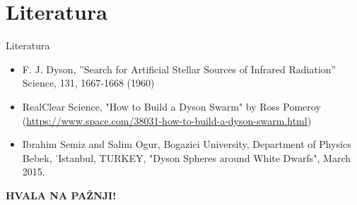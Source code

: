 \documentclass[13pt]{beamer}
\begin{document}
\section{Literatura}

\begin{frame}{Literatura}

\begin{itemize}
    \item F. J. Dyson, ”Search for Artificial Stellar Sources of Infrared Radiation”
Science, 131, 1667-1668 (1960)
    \item RealClear Science, "How to Build a Dyson Swarm" by Ross Pomeroy
    (\url{https://www.space.com/38031-how-to-build-a-dyson-swarm.html})
    \item Ibrahim Semiz and Salim Ogur, Bogazici University, Department of Physics Bebek, ˙Istanbul, TURKEY, "Dyson Spheres around White Dwarfs", March 2015.
\end{itemize}

\end{frame}


\begin{frame}

\begin{center}
    \textbf{HVALA NA PAŽNJI!}
\end{center}

\end{frame}
\end{document}
